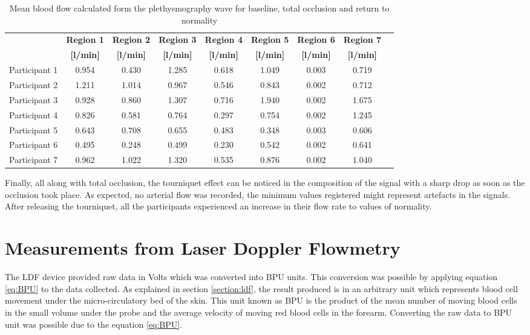 \begin{table}[!htb]
	\caption{Mean blood flow calculated form the plethysmography wave for baseline, total occlusion and return to normality}
	\label{tbl:DU flow}
	\centering \small
	\begin{tabular}{p{1.9cm}cccccccc}
		\toprule
		& \textbf{Region 1}
		& \textbf{Region 2}
		& \textbf{Region 3}
		& \textbf{Region 4}
		& \textbf{Region 5}
		& \textbf{Region 6}
		& \textbf{Region 7} \\
		& \textbf{[\si[per-mode=symbol]{\litre\per\minute}]}
		& \textbf{[\si[per-mode=symbol]{\litre\per\minute}]}
		& \textbf{[\si[per-mode=symbol]{\litre\per\minute}]}
		& \textbf{[\si[per-mode=symbol]{\litre\per\minute}]}
		& \textbf{[\si[per-mode=symbol]{\litre\per\minute}]}
		& \textbf{[\si[per-mode=symbol]{\litre\per\minute}]}
		& \textbf{[\si[per-mode=symbol]{\litre\per\minute}]} \\\midrule	
		Participant 1 & 0.954 & 0.430 & 1.285 & 0.618 & 1.049 & 0.003 & 0.719 \\
		Participant 2 & 1.211 & 1.014 & 0.967 & 0.546 & 0.843 & 0.002 & 0.712 \\  
		Participant 3 & 0.928 & 0.860 & 1.307 & 0.716 & 1.940 & 0.002 & 1.675 \\  
		Participant 4 & 0.826 & 0.581 & 0.764 & 0.297 & 0.754 & 0.002 & 1.245 \\  
		Participant 5 & 0.643 & 0.708 & 0.655 & 0.483 & 0.348 & 0.003 & 0.606 \\  
		Participant 6 & 0.495 & 0.248 & 0.499 & 0.230 & 0.542 & 0.002 & 0.641 \\  
		Participant 7 & 0.962 & 1.022 & 1.320 & 0.535 & 0.876 & 0.002 & 1.040 \\  	 
		\bottomrule
	\end{tabular}
\end{table}

Finally, all along with total occlusion, the tourniquet effect can be noticed in the composition of the signal with a sharp drop as soon as the occlusion took place. As expected, no arterial flow was recorded, the minimum values registered might represent artefacts in the signals. After releasing the tourniquet, all the participants experienced an increase in their flow rate to values of normality. 

\section{Measurements from Laser Doppler Flowmetry}
\label{section comparison 3}
The LDF device provided raw data in Volts which was converted into BPU units. This conversion was possible by applying equation \ref{eq:BPU} to the data collected. As explained in section \ref{section:ldf}, the result produced is in an arbitrary unit which represents blood cell movement under the micro-circulatory bed of the skin. This unit known as BPU is the product of the mean number of moving blood cells in the small volume under the probe and the average velocity of moving red blood cells in the forearm. Converting the raw data to BPU unit was possible due to the equation \ref{eq:BPU}.

